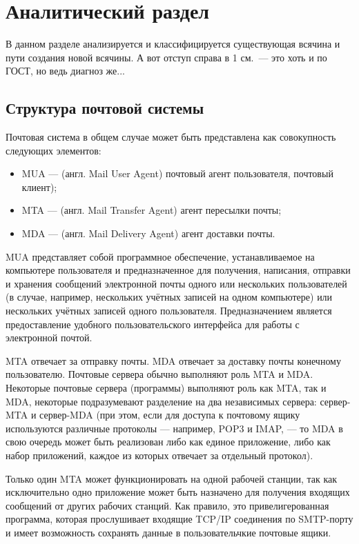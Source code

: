 \chapter{Аналитический раздел}
\label{cha:analysis}
%
%
В данном разделе анализируется и классифицируется существующая всячина и пути создания новой всячины. А вот отступ справа в 1 см.~--- это хоть и по ГОСТ, но ведь диагноз же...

\section{Структура почтовой системы}

Почтовая система в общем случае может быть представлена как совокупность следующих элементов:
\begin{itemize}
  \item MUA --- (англ. Mail User Agent) почтовый агент пользователя, почтовый клиент);
  \item MTA --- (англ. Mail Transfer Agent) агент пересылки почты;
  \item MDA --- (англ. Mail Delivery Agent) агент доставки почты.
\end{itemize}

MUA представляет собой программное обеспечение, устанавливаемое на компьютере пользователя и предназначенное для получения, написания, отправки и хранения сообщений электронной почты одного или нескольких пользователей (в случае, например, нескольких учётных записей на одном компьютере) или нескольких учётных записей одного пользователя. Предназначением является предоставление удобного пользовательского интерфейса для работы с электронной почтой.

MTA отвечает за отправку почты. MDA отвечает за доставку почты конечному пользователю. Почтовые сервера обычно выполняют роль MTA и MDA. Некоторые почтовые сервера (программы) выполняют роль как MTA, так и MDA, некоторые подразумевают разделение на два независимых сервера: сервер-MTA и сервер-MDA (при этом, если для доступа к почтовому ящику используются различные протоколы — например, POP3 и IMAP, — то MDA в свою очередь может быть реализован либо как единое приложение, либо как набор приложений, каждое из которых отвечает за отдельный протокол).

Только один MTA может функционировать на одной рабочей станции, так как исключительно одно приложение может быть назначено для получения входящих сообщений от других рабочих станций. Как правило, это привелигерованная программа, которая прослушивает входящие TCP/IP соединения по SMTP-порту и имеет возможность сохранять данные в пользовательчкие почтовые ящики.

